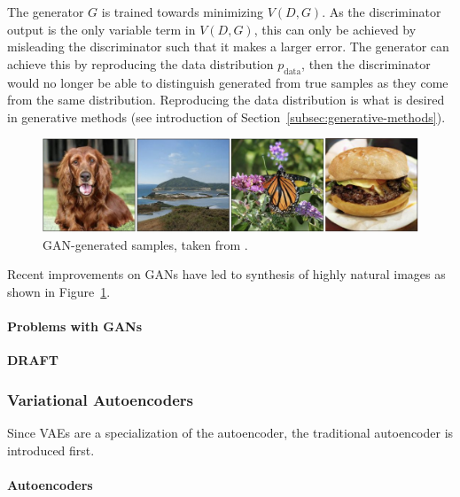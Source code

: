 The generator $G$ is trained towards minimizing $V(D, G)$.
As the discriminator output is the only variable term in $V(D, G)$, this can only be achieved by misleading the discriminator such that it makes a larger error.
The generator can achieve this by reproducing the data distribution $p_{\text{data}}$, then the discriminator would no longer be able to distinguish generated from true samples as they come from the same distribution.
Reproducing the data distribution is what is desired in generative methods (see introduction of Section~\ref{subsec:generative-methods}).

\begin{figure}
    \centering
    \includegraphics[width=\textwidth]{images/gan_samples.png}
    \caption[\ac{GAN}-generated samples]{\ac{GAN}-generated samples, taken from \citet{brock2018large}.}
    \label{fig:gan_samples}
\end{figure}

Recent improvements on \acp{GAN} have led to synthesis of highly natural images as shown in Figure~\ref{fig:gan_samples}.

\paragraph{Problems with \acp{GAN}}
\textbf{DRAFT}

\subsubsection{Variational Autoencoders}\label{subsec:variational-autoencoders}

Since \acfp{VAE} are a specialization of the autoencoder, the traditional autoencoder is introduced first.

\paragraph{Autoencoders}

